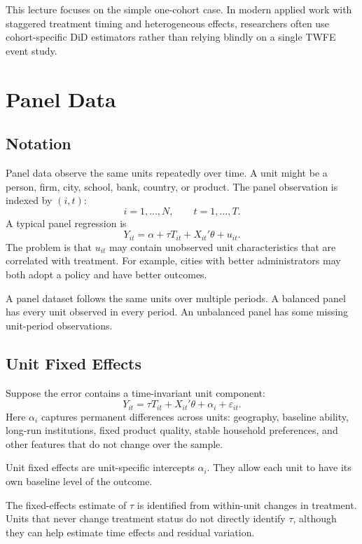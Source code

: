 This lecture focuses on the simple one-cohort case. In modern applied work with
staggered treatment timing and heterogeneous effects, researchers often use
cohort-specific DiD estimators rather than relying blindly on a single TWFE event
study.

\section{Panel Data}

\subsection{Notation}

Panel data observe the same units repeatedly over time. A unit might be a
person, firm, city, school, bank, country, or product. The panel observation is
indexed by $(i,t)$:
\[
    i=1,\ldots,N,
    \qquad
    t=1,\ldots,T.
\]
A typical panel regression is
\[
    Y_{it}=\alpha+\tau T_{it}+X_{it}'\theta+u_{it}.
\]
The problem is that $u_{it}$ may contain unobserved unit characteristics that
are correlated with treatment. For example, cities with better administrators
may both adopt a policy and have better outcomes.

\begin{defN}
A panel dataset follows the same units over multiple periods. A balanced panel
has every unit observed in every period. An unbalanced panel has some missing
unit-period observations.
\end{defN}

\subsection{Unit Fixed Effects}

Suppose the error contains a time-invariant unit component:
\[
    Y_{it}=\tau T_{it}+X_{it}'\theta+\alpha_i+\varepsilon_{it}.
\]
Here $\alpha_i$ captures permanent differences across units: geography,
baseline ability, long-run institutions, fixed product quality, stable household
preferences, and other features that do not change over the sample.

\begin{defN}
Unit fixed effects are unit-specific intercepts $\alpha_i$. They allow each unit
to have its own baseline level of the outcome.
\end{defN}

The fixed-effects estimate of $\tau$ is identified from within-unit changes in
treatment. Units that never change treatment status do not directly identify
$\tau$, although they can help estimate time effects and residual variation.

